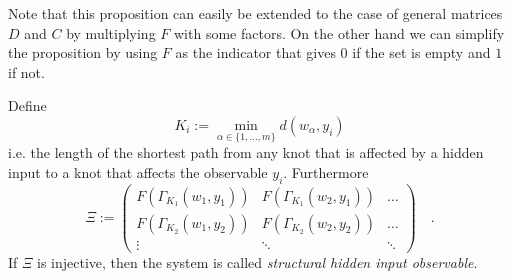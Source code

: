 Note that this proposition can easily be extended to the case of general matrices $D$ and 
$C$ by multiplying $F$ with some factors. On the other hand we can simplify the proposition 
by using $F$ as the indicator that gives $0$ if the set is empty and $1$ if not.\\


\begin{definition}{}{}
	Define 
	\begin{equation}
	K_i := \min\limits_{\alpha\in\{1,\ldots,m\}} d(w_\alpha,y_i)
	\end{equation}
	i.e. the length of the shortest path from any knot that is affected by a hidden input 
	to a knot that affects the observable $y_i$. Furthermore
	\begin{equation}
	\Xi := \begin{pmatrix}
	F\left(\Gamma_{K_1}(w_1,y_1) \right) & F\left(\Gamma_{K_1}(w_2,y_1) \right) & \ldots \\
	F\left(\Gamma_{K_2}(w_1,y_2) \right) & F\left(\Gamma_{K_2}(w_2,y_2) \right) & \ldots \\
	\vdots & \ddots & \ddots
	\end{pmatrix} \quad .
	\end{equation}
	If $\Xi$ is injective, then the system is called \textit{structural hidden input 
	observable}.
\end{definition}


